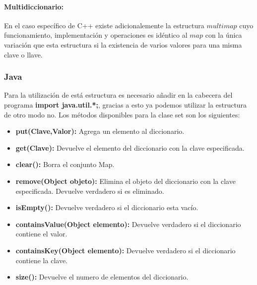\paragraph{Multidiccionario:}En el caso específico de C++ existe adicionalemente la estructura $multimap$ cuyo funcionamiento, implementación y operaciones es idéntico al $map$ con la única variación que esta estructura si la existencia de varios valores para una misma clave o llave. 

\subsubsection{Java}

Para la utilización de está estructura es necesario añadir en la cabecera del programa \textbf{import java.util.*;}, gracias a esto ya podemos utilizar la estructura de otro modo no. Los métodos disponibles para la clase set son los siguientes:

\begin{itemize}
	\item \textbf{put(Clave,Valor):} Agrega un elemento al diccionario.
	\item \textbf{get(Clave):} Devuelve el elemento del diccionario con la clave especificada.
	\item \textbf{clear():} Borra el conjunto Map.
	\item \textbf{remove(Object objeto):} Elimina el objeto del diccionario
con la clave especificada.
Devuelve verdadero si es eliminado.
	\item \textbf{isEmpty():} Devuelve verdadero si el diccionario esta vacío.
	\item \textbf{containsValue(Object elemento):} Devuelve verdadero si el diccionario
contiene el valor.
	\item \textbf{containsKey(Object elemento):} Devuelve verdadero si el diccionario
contiene la clave.
	\item \textbf{size():} Devuelve el numero de elementos
del diccionario.
\end{itemize}